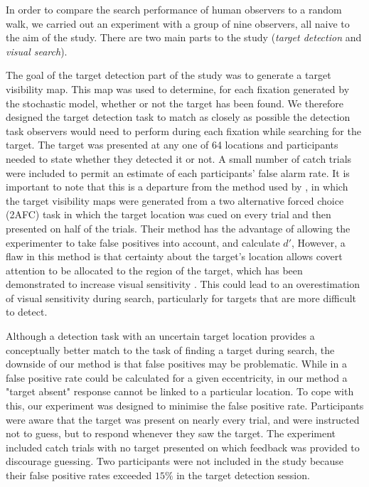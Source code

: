 \documentclass[man]{apa6}
\begin{document}
In order to compare the search performance of human observers to a random walk, we carried out an experiment with a group of nine observers, all naive to the aim of the study. There are two main parts to the study (\textit{target detection} and \textit{visual search}). 
\par
The goal of the target detection part of the study was to generate a target visibility map. This map was used to determine, for each fixation generated by the stochastic model, whether or not the target has been found. We therefore designed the target detection task to match as closely as possible the detection task observers would need to perform during each fixation while searching for the target. The target was presented at any one of 64 locations and participants needed to state whether they detected it or not. A small number of catch trials were included to permit an estimate of each participants' false alarm rate. It is important to note that this is a departure from the method used by \textcite{najemnik-geisler2005, najemnik-geisler2008}, in which the target visibility maps were generated from a two alternative forced choice (2AFC) task in which the target location was cued on every trial and then presented on half of the trials. Their method has the advantage of allowing the experimenter to take false positives into account, and calculate $d'$, However, a flaw in this method is that certainty about the target's location allows covert attention to be allocated to the region of the target, which has been demonstrated to increase visual sensitivity \parencite{yeshurun1998}. This could lead to an overestimation of visual sensitivity during search, particularly for targets that are more difficult to detect.

Although a detection task with an uncertain target location provides a conceptually better match to the task of finding a target during search, the downside of our method is that false positives may be problematic. While in \textcite{najemnik-geisler2005,najemnik-geisler2008} a false positive rate could be calculated for a given eccentricity, in our method a "target absent" response cannot be linked to a particular location. To cope with this, our experiment was designed to minimise the false positive rate. Participants were aware that the target was present on nearly every trial, and were instructed not to guess, but to respond whenever they saw the target. The experiment included catch trials with no target presented on which feedback was provided to discourage guessing. Two participants were not included in the study because their false positive rates exceeded $15\%$ in the target detection session.
\end{document}
